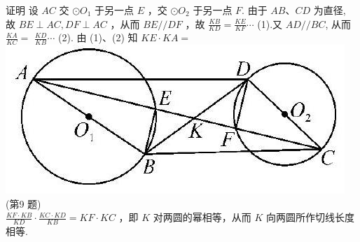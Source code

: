 \documentclass[10pt]{article}
\begin{document}
证明 设 $A C$ 交 $\odot O_{1}$ 于另一点 $E$ ，交 $\odot O_{2}$ 于另一点 $F$. 由于 $A B 、 C D$ 为直径, 故 $B E \perp A C, D F \perp A C$ ，从而 $B E / / D F$ ，故 $\frac{K B}{K D}=\frac{K E}{K F} \cdots$ (1).又 $A D / / B C$, 从而 $\frac{K A}{K C}=$ $\frac{K D}{K B} \cdots$ (2). 由 (1)、(2) 知 $K E \cdot K A=$\\
\includegraphics[max width=\textwidth, center]{2024_10_30_66b8e5e701da2093c133g-101(2)}\\
(第9 题)\\
$\frac{K F \cdot K B}{K D} \cdot \frac{K C \cdot K D}{K B}=K F \cdot K C$ ，即 $K$ 对两圆的幂相等，从而 $K$ 向两圆所作切线长度相等.
\end{document}
